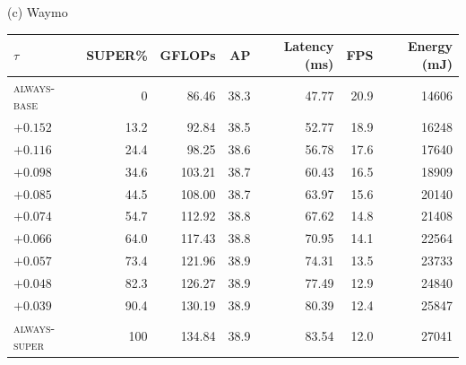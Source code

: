 \begin{table}[!t]
\begin{minipage}[t]{0.49\textwidth}
\centering
{\small (c) Waymo}\\[2pt]
\footnotesize
\begin{tabular}{lrrrrrr}
\toprule
$\tau$ & SUPER\% & GFLOPs & AP & Latency (ms) & FPS & Energy (mJ)\\
\midrule
\textsc{always-base} & 0 & 86.46 & 38.3 & 47.77 & 20.9 & 14606\\
$+0.152$ & 13.2 & 92.84 & 38.5 & 52.77 & 18.9 & 16248\\
$+0.116$ & 24.4 & 98.25 & 38.6 & 56.78 & 17.6 & 17640\\
$+0.098$ & 34.6 & 103.21 & 38.7 & 60.43 & 16.5 & 18909\\
$+0.085$ & 44.5 & 108.00 & 38.7 & 63.97 & 15.6 & 20140\\
$+0.074$ & 54.7 & 112.92 & 38.8 & 67.62 & 14.8 & 21408\\
$+0.066$ & 64.0 & 117.43 & 38.8 & 70.95 & 14.1 & 22564\\
$+0.057$ & 73.4 & 121.96 & 38.9 & 74.31 & 13.5 & 23733\\
$+0.048$ & 82.3 & 126.27 & 38.9 & 77.49 & 12.9 & 24840\\
$+0.039$ & 90.4 & 130.19 & 38.9 & 80.39 & 12.4 & 25847\\
\textsc{always-super} & 100 & 134.84 & 38.9 & 83.54 & 12.0 & 27041\\
\bottomrule
\end{tabular}
\end{minipage}
%
%

\end{table}

